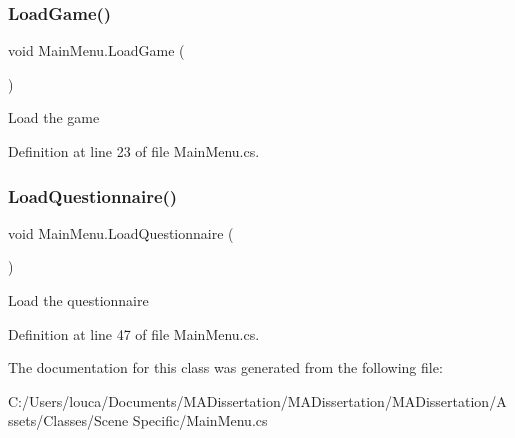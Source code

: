 \subsubsection{\texorpdfstring{Load\+Game()}{LoadGame()}}
{\footnotesize\ttfamily void Main\+Menu.\+Load\+Game (\begin{DoxyParamCaption}{ }\end{DoxyParamCaption})}



Load the game 



Definition at line 23 of file Main\+Menu.\+cs.

\mbox{\label{class_main_menu_a718238ca30f3203c53cd391a0881e543}} 
\subsubsection{\texorpdfstring{Load\+Questionnaire()}{LoadQuestionnaire()}}
{\footnotesize\ttfamily void Main\+Menu.\+Load\+Questionnaire (\begin{DoxyParamCaption}{ }\end{DoxyParamCaption})}



Load the questionnaire 



Definition at line 47 of file Main\+Menu.\+cs.



The documentation for this class was generated from the following file\+:\begin{DoxyCompactItemize}
\item 
C\+:/\+Users/louca/\+Documents/\+M\+A\+Dissertation/\+M\+A\+Dissertation/\+M\+A\+Dissertation/\+Assets/\+Classes/\+Scene Specific/Main\+Menu.\+cs\end{DoxyCompactItemize}

